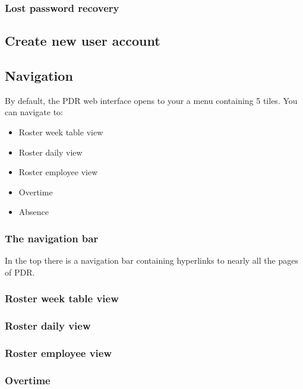 \documentclass[12pt,a4paper,titlepage]{report}
\begin{document}
\subsubsection{Lost password recovery}


\subsection{Create new user account}

\subsection{Navigation}
By default, the PDR web interface opens to your a menu containing 5 tiles.
You can navigate to:
\begin{itemize}
\item Roster week table view
\item Roster daily view
\item Roster employee view
\item Overtime 
\item Absence
\end{itemize}
\subsubsection{The navigation bar}
In the top there is a navigation bar containing hyperlinks to nearly all the pages of PDR.

\subsubsection{Roster week table view}
\subsubsection{Roster daily view}
\subsubsection{Roster employee view}
\subsubsection{Overtime}
\end{document}
